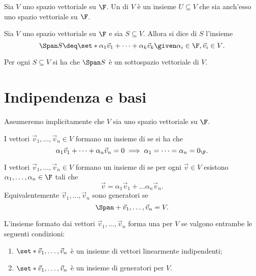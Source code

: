 \begin{definition}
    [Sottospazio]
    Sia $V$ uno spazio vettoriale su $\F$. Un  di $V$ è un insieme $U \subseteq V$ che sia anch'esso uno spazio vettoriale su $\F$. 
\end{definition}

\begin{definition}
    Sia $V$ uno spazio vettoriale su $\F$ e sia $S \subseteq V$. Allora si dice  di $S$ l'insieme \[
        \Span S \deq \set*{\alpha_1 \vec v_1 + \dots + \alpha_k \vec v_k \given \alpha_i \in \F, \vec v_i \in V}.
    \]  
\end{definition}

\begin{proposition}
    Per ogni $S \subseteq V$ si ha che $\Span S$ è un sottospazio vettoriale di $V$.
\end{proposition}

\section{Indipendenza e basi}

Assumeremo implicitamente che $V$ sia uno spazio vettoriale su $\F$.

\begin{definition}
    I vettori $\vec v_1, \dots, \vec v_n \in V$ formano un insieme di  se si ha che \[
        \alpha_1\vec v_1 + \dots + \alpha_n\vec v_n = 0 \implies \alpha_1 = \dots = \alpha_n = 0_{\F}.
    \]
\end{definition}

\begin{definition}
    I vettori $\vec v_1, \dots, \vec v_n \in V$ formano un insieme di  se per ogni $\vec v \in V$ esistono $\alpha_1, \dots, \alpha_n \in \F$ tali che \[
        \vec v = \alpha_1 \vec v_1 + \dots \alpha_n\vec v_n.
    \] Equivalentemente $\vec v_1, \dots, \vec v_n$ sono generatori se \[
        \Span+{\vec v_1, \dots, \vec v_n} = V.
    \] 
\end{definition}

\begin{definition}
    [Base]
    L'insieme formato dai vettori $\vec v_1, \dots, \vec v_n$ forma una  per $V$ se valgono entrambe le seguenti condizioni:
    \begin{enumerate}
        \item $\set*{\vec v_1, \dots, \vec v_n}$ è un insieme di vettori linearmente indipendenti;
        \item $\set*{\vec v_1, \dots, \vec v_n}$ è un insieme di generatori per $V$.
    \end{enumerate}
\end{definition}

